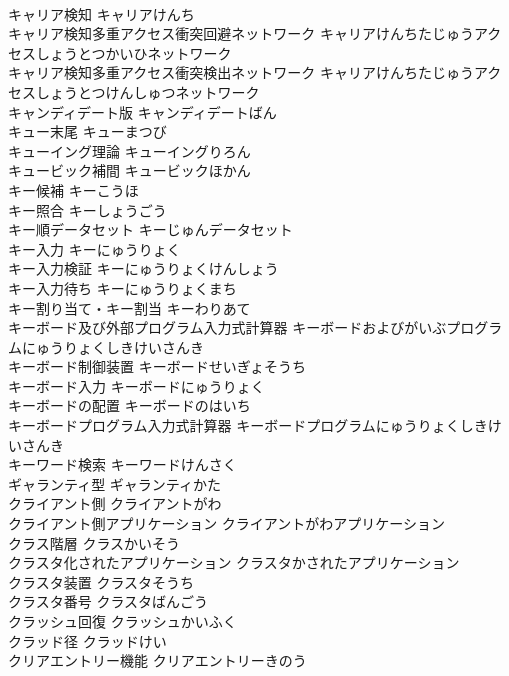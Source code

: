 \documentclass[8pt]{extreport}
\begin{document}
\begin{CJK}{UTF8}{min}
\\	キャリア検知	キャリアけんち	
\\	キャリア検知多重アクセス衝突回避ネットワーク	キャリアけんちたじゅうアクセスしょうとつかいひネットワーク	
\\	キャリア検知多重アクセス衝突検出ネットワーク	キャリアけんちたじゅうアクセスしょうとつけんしゅつネットワーク	
\\	キャンディデート版	キャンディデートばん	
\\	キュー末尾	キューまつび	
\\	キューイング理論	キューイングりろん	
\\	キュービック補間	キュービックほかん	
\\	キー候補	キーこうほ	
\\	キー照合	キーしょうごう	
\\	キー順データセット	キーじゅんデータセット	
\\	キー入力	キーにゅうりょく	
\\	キー入力検証	キーにゅうりょくけんしょう	
\\	キー入力待ち	キーにゅうりょくまち	
\\	キー割り当て・キー割当	キーわりあて	
\\	キーボード及び外部プログラム入力式計算器	キーボードおよびがいぶプログラムにゅうりょくしきけいさんき	
\\	キーボード制御装置	キーボードせいぎょそうち	
\\	キーボード入力	キーボードにゅうりょく	
\\	キーボードの配置	キーボードのはいち	
\\	キーボードプログラム入力式計算器	キーボードプログラムにゅうりょくしきけいさんき	
\\	キーワード検索	キーワードけんさく	
\\	ギャランティ型	ギャランティかた	
\\	クライアント側	クライアントがわ	
\\	クライアント側アプリケーション	クライアントがわアプリケーション	
\\	クラス階層	クラスかいそう	
\\	クラスタ化されたアプリケーション	クラスタかされたアプリケーション	
\\	クラスタ装置	クラスタそうち	
\\	クラスタ番号	クラスタばんごう	
\\	クラッシュ回復	クラッシュかいふく	
\\	クラッド径	クラッドけい	
\\	クリアエントリー機能	クリアエントリーきのう	

\end{CJK}
\end{document}
